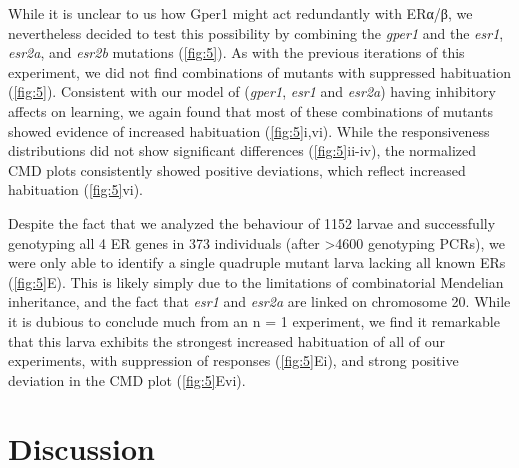 \documentclass[9.5pt,lineno]{RandlettLab_elife}
\begin{document}
{\begin{figure}
\begin{fullwidth}
\begin{center}
\label{fig:5}
\end{center}
\end{fullwidth}
\end{figure}


While it is unclear to us how Gper1 might act redundantly with ERα/β, we nevertheless decided to test this possibility by combining the \emph{gper1} and the \emph{esr1}, \emph{esr2a}, and \emph{esr2b} mutations (\autoref{fig:5}). 
As with the previous iterations of this experiment, we did not find combinations of mutants with suppressed habituation (\autoref{fig:5}). 
Consistent with our model of (\emph{gper1}, \emph{esr1} and \emph{esr2a}) having inhibitory affects on learning, we again found that most of these combinations of mutants showed evidence of increased habituation (\autoref{fig:5}i,vi).
While the  responsiveness distributions did not show significant differences (\autoref{fig:5}ii-iv), the normalized CMD plots consistently showed positive deviations, which reflect increased habituation (\autoref{fig:5}vi).

Despite the fact that we analyzed the behaviour of 1152 larvae and successfully genotyping all 4 ER genes in 373 individuals (after \textgreater 4600 genotyping PCRs), we were only able to identify a single quadruple mutant larva lacking all known ERs (\autoref{fig:5}E). 
This is likely simply due to the limitations of combinatorial Mendelian inheritance, and the fact that \emph{esr1} and \emph{esr2a} are linked on chromosome 20.   
While it is dubious to conclude much from an n = 1 experiment, we find it remarkable that this larva exhibits the strongest increased habituation of all of our experiments, with suppression of responses (\autoref{fig:5}Ei), and strong positive deviation in the CMD plot (\autoref{fig:5}Evi). 

\section{Discussion}

}
\end{document}
